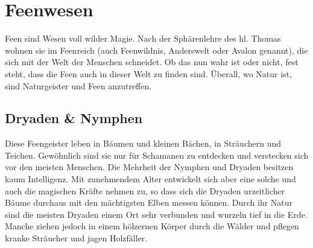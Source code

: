 \documentclass[12pt,twoside,twocolumn,openany]{book}
\begin{document}
%	
%
%	
%	
%
%
%

\section{Feenwesen}
Feen sind Wesen voll wilder Magie. Nach der Sphärenlehre des hl. Thomas wohnen sie im Feenreich (auch Feenwildnis, Anderswelt oder Avalon genannt), die sich mit der Welt der Menschen schneidet. Ob das nun wahr ist oder nicht, fest steht, dass die Feen auch in dieser Welt zu finden sind. Überall, wo Natur ist, sind Naturgeister und Feen anzutreffen.

\subsection{Dryaden \& Nymphen}
Diese Feengeister leben in Bäumen und kleinen Bächen, in Sträuchern und Teichen. Gewöhnlich sind sie nur für Schamanen zu entdecken und verstecken sich vor den meisten Menschen. Die Mehrheit der Nymphen und Dryaden besitzen kaum Intelligenz. Mit zunehmendem Alter entwickelt sich aber eine solche und auch die magischen Kräfte nehmen zu, so dass sich die Dryaden urzeitlicher Bäume durchaus mit den mächtigsten Elben messen können.
Durch ihr Natur sind die meisten Dryaden einem Ort sehr verbunden und wurzeln tief in die Erde. Manche ziehen jedoch in einem hölzernen Körper durch die Wälder und pflegen kranke Sträucher und jagen Holzfäller.
\end{document}
